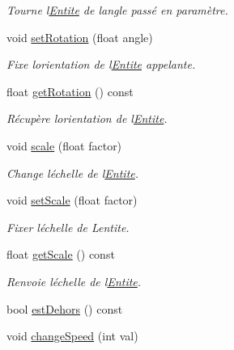 \begin{DoxyCompactItemize}
\begin{DoxyCompactList}\small\item\em Tourne l\textquotesingle{}\hyperlink{class_entite}{Entite} de l\textquotesingle{}angle passé en paramètre. \end{DoxyCompactList}\item 
void \hyperlink{class_entite_a8623ac815e34b553098f45696ea8918b}{set\+Rotation} (float angle)
\begin{DoxyCompactList}\small\item\em Fixe l\textquotesingle{}orientation de l\textquotesingle{}\hyperlink{class_entite}{Entite} appelante. \end{DoxyCompactList}\item 
float \hyperlink{class_entite_a7f19439f7e7a5028f4b26eff21683de9}{get\+Rotation} () const
\begin{DoxyCompactList}\small\item\em Récupère l\textquotesingle{}orientation de l\textquotesingle{}\hyperlink{class_entite}{Entite}. \end{DoxyCompactList}\item 
void \hyperlink{class_entite_a770f6c53856606c4de768bb942299659}{scale} (float factor)
\begin{DoxyCompactList}\small\item\em Change l\textquotesingle{}échelle de l\textquotesingle{}\hyperlink{class_entite}{Entite}. \end{DoxyCompactList}\item 
void \hyperlink{class_entite_a665939253829baba965ce3ead0f1739c}{set\+Scale} (float factor)
\begin{DoxyCompactList}\small\item\em Fixer l\textquotesingle{}échelle de L\textquotesingle{}entite. \end{DoxyCompactList}\item 
float \hyperlink{class_entite_a5f70868f62049291edf4b245a531a6e0}{get\+Scale} () const
\begin{DoxyCompactList}\small\item\em Renvoie l\textquotesingle{}échelle de l\textquotesingle{}\hyperlink{class_entite}{Entite}. \end{DoxyCompactList}\item 
bool \hyperlink{class_entite_a8734ec47c87feb2b8b221bbf5d9ff2b4}{est\+Dehors} () const
\item 
void \hyperlink{class_entite_a88c148848289e34ca3bc991c37db9b44}{change\+Speed} (int val)
\end{DoxyCompactItemize}
